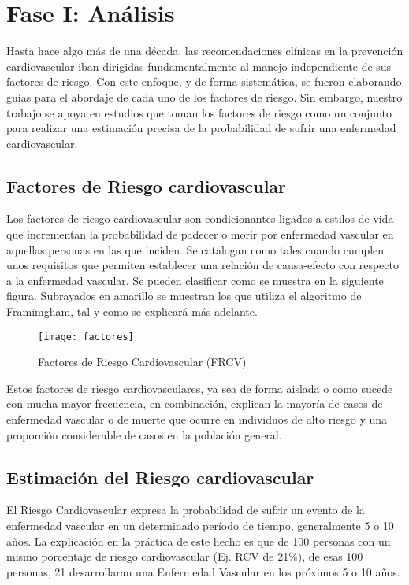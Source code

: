 \chapter {Fase I: Análisis}
\label{cap:Fase I. Análisis}

Hasta hace algo más de una década, las recomendaciones clínicas en la prevención cardiovascular iban dirigidas fundamentalmente al manejo independiente de sus factores de riesgo. Con este enfoque, y de forma sistemática, se fueron elaborando guías para el abordaje de cada uno de los factores de riesgo. Sin embargo,  nuestro trabajo se apoya en estudios que toman los factores de riesgo como un conjunto para realizar una estimación precisa de la probabilidad de sufrir una enfermedad cardiovascular. 


\section{Factores de Riesgo cardiovascular}
Los factores de riesgo cardiovascular son condicionantes ligados a estilos de vida que incrementan la probabilidad de padecer o morir por enfermedad vascular en aquellas personas en las que inciden. Se catalogan como tales cuando cumplen unos requisitos que permiten establecer una relación de causa-efecto con respecto a la enfermedad vascular. Se pueden clasificar como se muestra en la siguiente figura. Subrayados en amarillo se muestran los que utiliza el algoritmo de Framimgham, tal y como se explicará más adelante. 

\begin{figure}[htb]
	\centering
	\texttt{[image: factores]} 
	\caption[Tabla Factores]{Factores de Riesgo Cardiovascular (FRCV) \cite{tagle2007estimacion}
	}
	\label{fig:factores}
\end{figure}

Estos factores de riesgo cardiovasculares, ya sea de forma aislada o como sucede con mucha mayor frecuencia, en combinación, explican la mayoría de casos de enfermedad vascular o de muerte que ocurre en individuos de alto riesgo y una proporción considerable de casos en la población general.


\section{Estimación del Riesgo cardiovascular}
El Riesgo Cardiovascular expresa la probabilidad de sufrir un evento de la enfermedad vascular en un determinado período de tiempo, generalmente 5 o 10 años. La explicación en la práctica de este hecho es que de 100 personas con un mismo porcentaje de riesgo cardiovascular (Ej. RCV de 21\%), de esas 100 personas, 21 desarrollaran una Enfermedad Vascular en los próximos 5 o 10 años.

